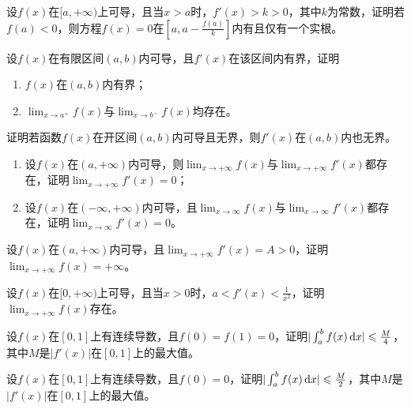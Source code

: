\begin{example}
	设$f(x)$在$[a,+\infty)$上可导，且当$x>a$时，$f'(x)>k>0$，其中$k为常数$，证明若$f(a)<0$，则方程$f(x)=0$在$[a,a-\frac{f(a)}{k}]$内有且仅有一个实根。
\end{example}

\begin{example}
	设$f(x)$在有限区间$(a,b)$内可导，且$f'(x)$在该区间内有界，证明
	\begin{enumerate}
		\item $f(x)$在$(a,b)$内有界；
		\item $\lim_{x\to a^+}f(x)$与$\lim_{x\to b^-}f(x)$均存在。
	\end{enumerate}
\end{example}

\begin{example}
	证明若函数$f(x)$在开区间$(a,b)$内可导且无界，则$f'(x)$在$(a,b)$内也无界。
\end{example}

\begin{example}
	\begin{enumerate}
		\item 设$f(x)$在$(a,+\infty)$内可导，则$\lim_{x\to+\infty}f(x)$与$\lim_{x\to+\infty}f'(x)$都存在，证明$\lim_{x\to+\infty}f'(x)=0$；
		\item 设$f(x)$在$(-\infty,+\infty)$内可导，且$\lim_{x\to\infty}f(x)$与$\lim_{x\to\infty}f'(x)$都存在，证明$\lim_{x\to\infty}f'(x)=0$。
	\end{enumerate}
\end{example}

\begin{example}
	设$f(x)$在$(a,+\infty)$内可导，且$\lim_{x\to+\infty}f'(x)=A>0$，证明$\lim_{x\to+\infty}f(x)=+\infty$。
\end{example}

\begin{example}
	设$f(x)$在$[0,+\infty)$上可导，且当$x>0$时，$a<f'(x)<\frac{1}{x^2}$，证明$\lim_{x\to+\infty}f(x)$存在。
\end{example}

\begin{example}
	设$f(x)$在$[0,1]$上有连续导数，且$f(0)=f(1)=0$，证明$|\int_{a}^{b}f(x)\,\mathrm{d} x|\leqslant\frac{M}{4}$，其中$M$是$|f'(x)|$在$[0,1]$上的最大值。
\end{example}

\begin{example}
	设$f(x)$在$[0,1]$上有连续导数，且$f(0)=0$，证明$|\int_{a}^{b}f(x)\,\mathrm{d} x|\leqslant\frac{M}{2}$，其中$M$是$|f'(x)|$在$[0,1]$上的最大值。
\end{example}

